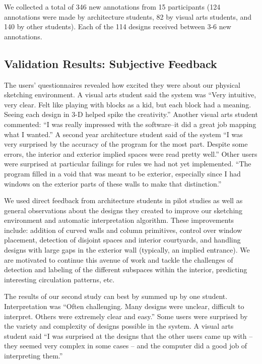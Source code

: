 We collected a total of 346 new annotations from 15 participants (124
annotations were made by architecture students, 82 by visual arts
students, and 140 by other students).  Each of the 114 designs received
between 3-6 new annotations.

\subsection{Validation Results: Subjective Feedback}


The users' questionnaires revealed how excited they were about our
physical sketching environment.  A visual arts student said the system
was ``Very intuitive, very clear.  Felt like playing with blocks as a
kid, but each block had a meaning.  Seeing each design in 3-D helped
spike the creativity.''  Another visual arts student commented: ``I was
really impressed with the software--it did a great job mapping what I
wanted.''  A second year architecture student said of the system ``I
was very surprised by the accuracy of the program for the most part.
Despite some errors, the interior and exterior implied spaces were
read pretty well.''  Other users were surprised at particular failings
for rules we had not yet implemented.  ``The program filled in a void
that was meant to be exterior, especially since I had windows on the
exterior parts of these walls to make that distinction.''

We used direct feedback from architecture students in pilot studies as
well as general observations about the designs they created to improve
our sketching environment and automatic interpretation algorithm.
These improvements include: addition of curved walls and column
primitives, control over window placement, detection of disjoint
spaces and interior courtyards, and handling designs with large gaps
in the exterior wall (typically, an implied entrance).  We are
motivated to continue this avenue of work and tackle the challenges of
detection and labeling of the different subspaces within the
interior, predicting interesting circulation patterns, etc.


The results of our second study can best by summed up by one student.
Interpretation was ``Often challenging.  Many designs were unclear,
difficult to interpret.  Others were extremely clear and easy.''  Some
users were surprised by the variety and complexity of designs possible
in the system.  A visual arts student said ``I was surprised at the
designs that the other users came up with -- they seemed very complex
in some cases -- and the computer did a good job of interpreting
them.''

